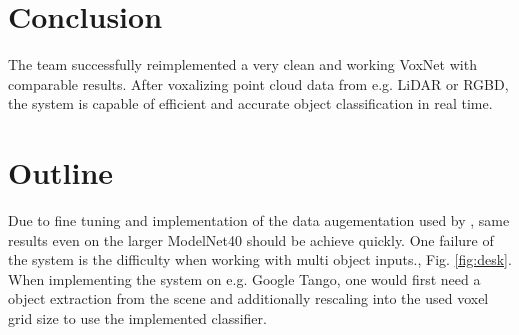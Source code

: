 \documentclass[10pt,twocolumn,letterpaper]{article}
\begin{document}
\section{Conclusion}

The team successfully reimplemented a very clean and working VoxNet with comparable results.
After voxalizing point cloud data from e.g. LiDAR or RGBD, the system is capable of efficient and accurate object classification in real time. 

\section{Outline}
Due to fine tuning and implementation of the data augementation used by \cite{voxnet}, same results even on the larger ModelNet40 
should be achieve quickly. One failure of the system is the difficulty when working with multi object inputs., Fig. \ref{fig:desk}. 
When implementing the system on e.g. Google Tango, one would first need a object extraction from the scene and additionally rescaling into the used voxel grid size to use the implemented classifier. 

{\small


}
\end{document}
